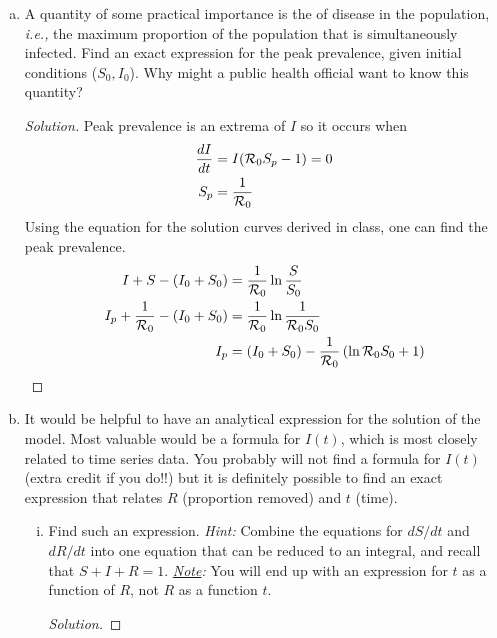 \documentclass[12pt]{article}
\begin{document}
\begin{enumerate}[(a)]

\item A quantity of some practical importance is the  of disease in the population, \emph{i.e.,} the maximum proportion of the population that is simultaneously infected.  Find an exact expression for the peak prevalence, given initial conditions ($S_0,I_0$).  Why might a public health official want to know this quantity?

{\color{blue}
\begin{proof}[Solution]
{\color{magenta}

	Peak prevalence is an extrema of $I$ so it occurs when 
	\begin{align}
		\frac{dI}{dt} &= I({\cal R}_0 S_p - 1) = 0 \\
		S_p &= \frac{1}{{\cal R}_0}
	\end{align}
	Using the equation for the solution curves derived in class, one can find the peak prevalence.
	\begin{align}
		I + S - (I_0+S_0) &= \frac{1}{{\cal R}_0}\ln{\frac{S}{S_0}} \\
		I_p + \frac{1}{{\cal R}_0} - (I_0+S_0) &= \frac{1}{{\cal R}_0}\ln{\frac{1}{{\cal R}_0 S_0}} \\
		I_p &= (I_0+S_0) - \frac{1}{{\cal R}_0} \left (\ln{{\cal R}_0 S_0} +1 \right )
	\end{align}

}
\end{proof}
}

\item It would be helpful to have an analytical expression for the solution of the model.  Most valuable would be a formula for $I(t)$, which is most closely related to time series data.  You probably will not find a formula for $I(t)$ (extra credit if you do!!) but it is definitely possible to find an exact expression that relates $R$ (proportion removed) and $t$ (time).

\begin{enumerate}[(i)]

\item Find such an expression.  \emph{Hint:} Combine the equations for $dS/dt$ and $dR/dt$ into one equation that can be reduced to an integral, and recall that $S+I+R=1$.  \emph{\underline{Note}:} You will end up with an expression for $t$ as a function of $R$, not $R$ as a function $t$.

{\color{blue}
\begin{proof}[Solution]
{\color{magenta}

}
\end{proof}}
\end{enumerate}
\end{enumerate}
\end{document}
